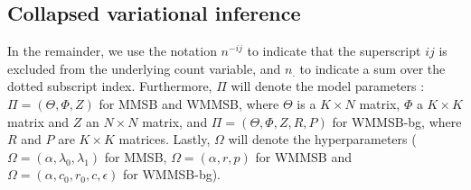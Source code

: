 \subsection{Collapsed variational inference}

In the remainder, we use the notation $n^{-ij}$ to indicate that the superscript $ij$ is excluded from the underlying count variable, and $n_{\bm{.}}$ to indicate a sum over the dotted subscript index. Furthermore, $\Pi$ will denote the model parameters : $\Pi = (\Theta,\Phi,Z)$ for MMSB and WMMSB, where $\Theta$ is a $K \times N$ matrix, $\Phi$ a $K \times K$ matrix and $Z$ an $N \times N$ matrix, and $\Pi = (\Theta,\Phi,Z,R,P)$ for WMMSB-bg, where $R$ and $P$ are $K \times K$ matrices. Lastly, $\Omega$ will denote the hyperparameters ($\Omega = (\alpha,\lambda_0,\lambda_1)$ for MMSB, $\Omega = (\alpha,r,p)$ for WMMSB and $\Omega = (\alpha, c_0, r_0, c, \epsilon)$ for WMMSB-bg).

